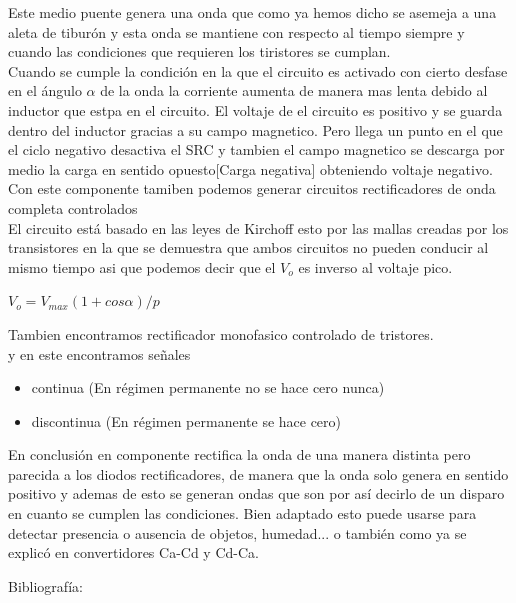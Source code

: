 \documentclass[letterpaper]{article}
\begin{document}
\begin{Large}
Este medio puente genera una onda que como ya hemos dicho se asemeja a una aleta de tiburón y esta onda se mantiene con respecto al tiempo siempre y cuando las condiciones que requieren los tiristores se cumplan.\\

Cuando se cumple la condición en la que el circuito es activado con cierto desfase en el ángulo $\alpha$ de la onda la corriente aumenta de manera mas lenta debido al inductor que estpa en el circuito. 
El voltaje de el circuito es positivo y se guarda dentro del inductor gracias a su campo magnetico. Pero llega un punto en el que el ciclo negativo desactiva el SRC y tambien el campo magnetico se descarga por medio la carga en sentido opuesto[Carga negativa] obteniendo voltaje negativo.\\

Con este componente tamiben podemos generar circuitos rectificadores de onda completa controlados\\
El circuito está basado en las leyes de Kirchoff esto por las mallas creadas por los transistores en la que se demuestra que ambos circuitos no pueden conducir al mismo tiempo asi que podemos decir que el $V_o$ es inverso al voltaje pico.
 \vspace{1.5cm}
\begin{center}
$V_o = V_{max}(1+cos \alpha)/p$
\end{center}
\newpage

Tambien encontramos rectificador monofasico controlado de tristores.\\
	y en este encontramos señales 
	\begin{itemize}
	 \item continua (En régimen permanente no se hace cero nunca)
	 \item discontinua (En régimen permanente se hace cero)
	\end{itemize}
	
	
En conclusión en componente rectifica la onda de una manera distinta pero parecida a los diodos rectificadores, de manera que la onda solo genera en sentido positivo y ademas de esto se generan ondas que son por así decirlo de un disparo en cuanto se cumplen las condiciones. Bien adaptado esto puede usarse para detectar presencia o ausencia de objetos, humedad... o también como ya se explicó en convertidores Ca-Cd y Cd-Ca.


\newpage
Bibliografía: 
 	


\end{Large}
\end{document}
